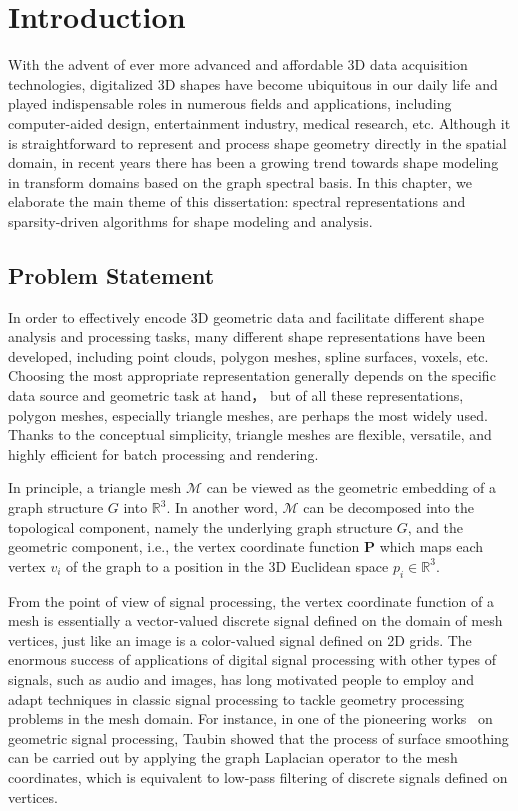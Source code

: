 \chapter{Introduction}

With the advent of ever more advanced and affordable 3D data acquisition
technologies, digitalized 3D shapes have become ubiquitous in our daily 
life and played indispensable roles in numerous fields and applications, 
including computer-aided design, entertainment industry, medical research, etc. 
Although it is straightforward to represent and process shape geometry directly
in the spatial domain, in recent years there has been a growing trend towards 
shape modeling in transform domains based on the graph spectral basis. 
In this chapter, we elaborate the main theme of this dissertation:
spectral representations and sparsity-driven algorithms for shape modeling
and analysis.

\section{Problem Statement}

In order to effectively encode 3D geometric data and facilitate different 
shape analysis and processing tasks, many different shape representations have
been developed, including point clouds, polygon meshes, spline surfaces, 
voxels, etc. Choosing the most appropriate representation generally depends on the
specific data source and geometric task at hand， but of all these representations,
polygon meshes, especially triangle meshes, are perhaps the most widely used.
Thanks to the conceptual simplicity, triangle meshes are flexible, versatile, 
and highly efficient for batch processing and rendering. 

In principle, a triangle mesh $\mathcal{M}$ can be viewed as the geometric 
embedding of a graph structure $G$ into $\mathbb{R}^3$. In another word,
$\mathcal{M}$ can be decomposed into the topological component, namely the 
underlying graph structure $G$, and the geometric component, i.e., the 
vertex coordinate function $\mathbf{P}$ which maps each vertex $v_i$ of
the graph to a position in the 3D Euclidean space $p_i\in\mathbb{R}^3$.

From the point of view of signal processing, the vertex coordinate function of 
a mesh is essentially a vector-valued discrete signal defined on the domain of 
mesh vertices, just like an image is a color-valued signal defined on 2D grids. 
The enormous success of applications of digital signal processing with other types 
of signals, such as audio and images, has long motivated people to employ and 
adapt techniques in classic signal processing to tackle geometry 
processing problems in the mesh domain. For instance, in one of the pioneering 
works~\cite{Taubin1995} on geometric signal processing, Taubin showed that the
process of surface smoothing can be carried out by applying the graph Laplacian 
operator to the mesh coordinates, which is equivalent to low-pass filtering
of discrete signals defined on vertices.  

